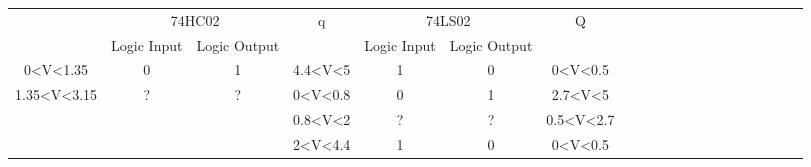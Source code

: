 \begin{center}
\begin{table}[]
\begin{tabular}{llllllllllllllllllll}
\cline{1-7}
\multicolumn{1}{|c|}{\multirow{2}{*}{}}                                & \multicolumn{2}{c|}{74HC02}                                                       & \multicolumn{1}{c|}{\multirow{2}{*}{q}}          & \multicolumn{2}{c|}{74LS02}                                          & \multicolumn{1}{c|}{\multirow{2}{*}{Q}}            &  &  &  &  &  &  &  &  &  &  &  &  &  \\ \cline{2-3} \cline{5-6}
\multicolumn{1}{|c|}{}                                                 & \multicolumn{1}{c|}{Logic Input}        & \multicolumn{1}{c|}{Logic Output}       & \multicolumn{1}{c|}{}                            & \multicolumn{1}{c|}{Logic Input} & \multicolumn{1}{c|}{Logic Output} & \multicolumn{1}{c|}{}                              &  &  &  &  &  &  &  &  &  &  &  &  &  \\ \cline{1-7}
\multicolumn{1}{|c|}{0\textless{}V\textless{}1.35}                     & \multicolumn{1}{c|}{0}                  & \multicolumn{1}{c|}{1}                  & \multicolumn{1}{c|}{4.4\textless{}V\textless{}5} & \multicolumn{1}{c|}{1}           & \multicolumn{1}{c|}{0}            & \multicolumn{1}{c|}{0\textless{}V\textless{}0.5}   &  &  &  &  &  &  &  &  &  &  &  &  &  \\ \cline{1-7}
\multicolumn{1}{|c|}{\multirow{3}{*}{1.35\textless{}V\textless{}3.15}} & \multicolumn{1}{c|}{\multirow{3}{*}{?}} & \multicolumn{1}{c|}{\multirow{3}{*}{?}} & \multicolumn{1}{c|}{0\textless{}V\textless{}0.8} & \multicolumn{1}{c|}{0}           & \multicolumn{1}{c|}{1}            & \multicolumn{1}{c|}{2.7\textless{}V\textless{}5}   &  &  &  &  &  &  &  &  &  &  &  &  &  \\ \cline{4-7}
\multicolumn{1}{|c|}{}                                                 & \multicolumn{1}{c|}{}                   & \multicolumn{1}{c|}{}                   & \multicolumn{1}{c|}{0.8\textless{}V\textless{}2} & \multicolumn{1}{c|}{?}           & \multicolumn{1}{c|}{?}            & \multicolumn{1}{c|}{0.5\textless{}V\textless{}2.7} &  &  &  &  &  &  &  &  &  &  &  &  &  \\ \cline{4-7}
\multicolumn{1}{|c|}{}                                                 & \multicolumn{1}{c|}{}                   & \multicolumn{1}{c|}{}                   & \multicolumn{1}{c|}{2\textless{}V\textless{}4.4} & \multicolumn{1}{c|}{1}           & \multicolumn{1}{c|}{0}            & \multicolumn{1}{c|}{0\textless{}V\textless{}0.5}   &  &  &  &  &  &  &  &  &  &  &  &  &  \\ \cline{1-7}

\end{tabular}
\end{table}
\end{center}
